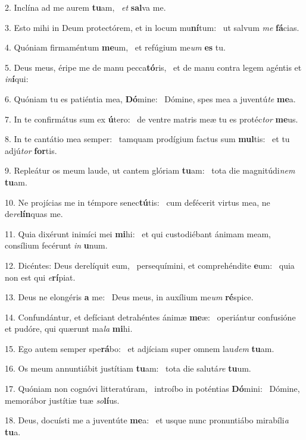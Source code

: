 2. Inclína ad me aurem \textbf{tu}am, \ast\  \textit{et} \textbf{sal}va me.\

3. Esto mihi in Deum protectórem, et in locum mu\textbf{ní}tum: \ast\  ut salvum \textit{me} \textbf{fá}cias.\

4. Quóniam firmaméntum \textbf{me}um, \ast\  et refúgium me\textit{um} \textbf{es} tu.\

5. Deus meus, éripe me de manu pecca\textbf{tó}ris, \ast\  et de manu contra legem agéntis et \textit{in}\textbf{í}qui:\

6. Quóniam tu es patiéntia mea, \textbf{Dó}mine: \ast\  Dómine, spes mea a juventú\textit{te} \textbf{me}a.\

7. In te confirmátus sum ex \textbf{ú}tero: \ast\  de ventre matris meæ tu es protéc\textit{tor} \textbf{me}us.\

8. In te cantátio mea semper: \dag\  tamquam prodígium factus sum \textbf{mul}tis: \ast\  et tu adjú\textit{tor} \textbf{for}tis.\

9. Repleátur os meum laude, ut cantem glóriam \textbf{tu}am: \ast\  tota die magnitúdi\textit{nem} \textbf{tu}am.\

10. Ne projícias me in témpore senec\textbf{tú}tis: \ast\  cum defécerit virtus mea, ne de\textit{re}\textbf{lín}quas me.\

11. Quia dixérunt inimíci mei \textbf{mi}hi: \ast\  et qui custodiébant ánimam meam, consílium fecérunt \textit{in} \textbf{u}num.\

12. Dicéntes: Deus derelíquit eum, \dag\  persequímini, et comprehéndite \textbf{e}um: \ast\  quia non est qui \textit{e}\textbf{rí}piat.\

13. Deus ne elongéris \textbf{a} me: \ast\  Deus meus, in auxílium me\textit{um} \textbf{ré}spice.\

14. Confundántur, et defíciant detrahéntes ánimæ \textbf{me}æ: \ast\  operiántur confusióne et pudóre, qui quærunt ma\textit{la} \textbf{mi}hi.\

15. Ego autem semper spe\textbf{rá}bo: \ast\  et adjíciam super omnem lau\textit{dem} \textbf{tu}am.\

16. Os meum annuntiábit justítiam \textbf{tu}am: \ast\  tota die salutá\textit{re} \textbf{tu}um.\

17. Quóniam non cognóvi litteratúram, \dag\  introíbo in poténtias \textbf{Dó}mini: \ast\  Dómine, memorábor justítiæ tuæ \textit{so}\textbf{lí}us.\

18. Deus, docuísti me a juventúte \textbf{me}a: \ast\  et usque nunc pronuntiábo mirabíli\textit{a} \textbf{tu}a.\

